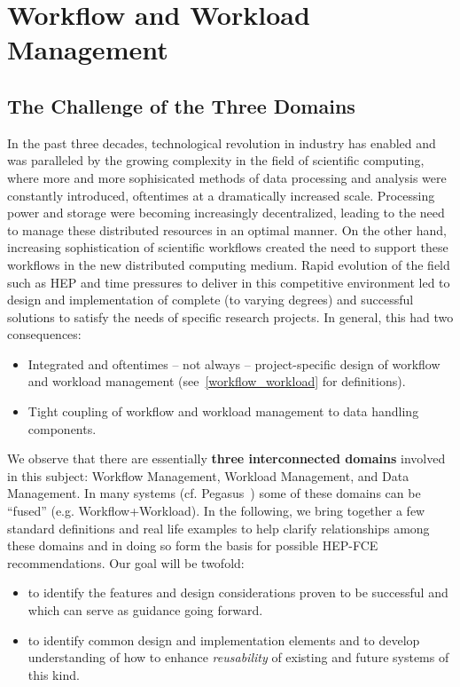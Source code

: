 \section{Workflow and Workload Management}


\subsection{The Challenge of the Three Domains}
In the past three decades, technological revolution in industry has enabled and was paralleled by the growing complexity in the field of scientific computing, where 
more and more sophisicated methods of data processing and analysis were constantly introduced, oftentimes at a dramatically increased scale.
Processing power and storage were becoming increasingly decentralized, leading to the need to manage these distributed resources in an optimal manner.
On the other hand, increasing sophistication of scientific workflows created the need to support these workflows in the new distributed computing medium.
Rapid evolution of the field such as HEP and time pressures to deliver in this competitive environment led to design and implementation of complete (to varying degrees)
and successful solutions to satisfy the needs of specific  research projects. In general, this had two consequences:

\begin{itemize}
\item Integrated and oftentimes -- not always -- project-specific design of workflow and workload management (see~\ref{workflow_workload} for definitions).
\item Tight coupling of workflow and workload management to data handling components.
\end{itemize}

We observe that there are essentially \textbf{three interconnected domains} involved in this subject: Workflow Management, Workload Management,
and Data Management. In many systems (cf. Pegasus~\cite{pegasus}) some of these domains can be ``fused'' (e.g. Workflow+Workload).
In the following, we  bring together a few standard definitions and real life examples to help clarify
relationships among these domains and in doing so form the basis for possible HEP-FCE recommendations. Our goal will be twofold:
\begin{itemize}
\item to identify the features and design considerations proven to be successful and which can serve as guidance going forward.
\item to identify common design and implementation elements and to develop understanding of how to enhance \textit{reusability} of existing and future systems of this kind.
\end{itemize}

